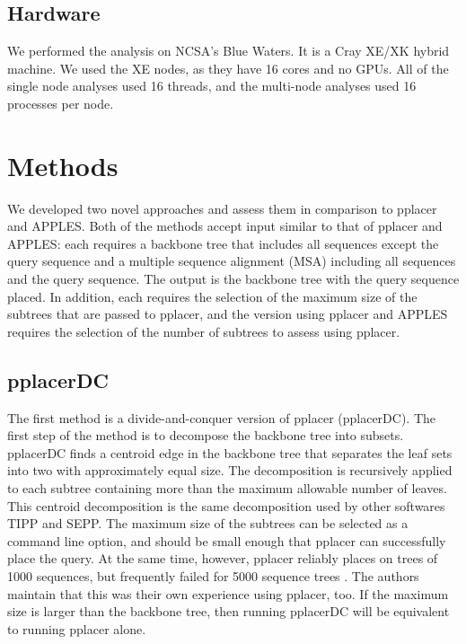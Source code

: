 \documentclass[10pt]{article}
\begin{document}
\subsection{Hardware}

We performed the analysis on NCSA's Blue Waters. It is a Cray XE/XK hybrid machine. We used the XE nodes, as they have 16 cores and no GPUs. All of the single node analyses used 16 threads, and the multi-node analyses used 16 processes per node.

\section{Methods}

We developed two novel approaches and assess them in comparison to pplacer and APPLES.
Both of the methods accept input similar to that of pplacer and APPLES:
each requires a backbone tree that includes all sequences except the query sequence and a multiple sequence alignment (MSA) including all sequences and the query sequence.
The output is the backbone tree with the query sequence placed.
In addition, each requires the selection of the maximum size of the subtrees that are passed to pplacer, and the version using pplacer and APPLES requires the selection of the number of subtrees to assess using pplacer.

\subsection{pplacerDC}

The first method is a divide-and-conquer version of pplacer (pplacerDC).
The first step of the method is to decompose the backbone tree into subsets.
pplacerDC finds a centroid edge in the backbone tree that separates the leaf
sets into two with approximately equal size.
The decomposition is recursively applied to each subtree containing more
than the maximum allowable number of leaves.
This centroid decomposition is the same decomposition used by other softwares TIPP and SEPP\cite{nguyen_tipp_2014}.
The maximum size of the subtrees can be selected as a command line option, and should be small enough that pplacer can successfully place the query.
At the same time, however, 
pplacer reliably places on trees of 1000 sequences, but frequently failed for 5000 sequence trees \cite{balaban_apples_2020}.
The authors maintain that this was their own experience using pplacer, too.
If the maximum size is larger than the backbone tree, then running pplacerDC will be equivalent to running pplacer alone.
\end{document}

